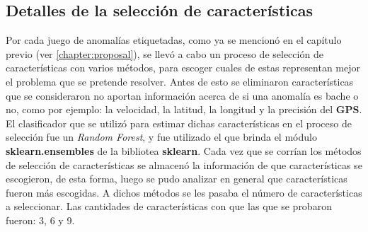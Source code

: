 	\subsection{Detalles de la selección de características}
		Por cada juego de anomalías etiquetadas, como ya se mencionó en el capítulo previo (ver \ref{chapter:proposal}), se llevó a cabo un proceso
		de selección de características con varios métodos, para escoger cuales de estas representan mejor el problema que se pretende resolver.
		Antes de esto se eliminaron características que se consideraron no aportan información acerca de si una anomalía es bache o no, como por ejemplo:
		la velocidad, la latitud, la longitud y la precisión del \textbf{GPS}.\\
		\indent El clasificador que se utilizó para estimar dichas características en el proceso de selección fue un \emph{Random Forest}, y fue
		utilizado el que brinda el módulo \textbf{sklearn.ensembles} de la bibliotea \textbf{sklearn}. Cada vez que se corrían los métodos de selección
		de características se almacenó la información de que características se escogieron, de esta forma, luego se pudo analizar en general que
		características fueron más escogidas. A dichos métodos se les pasaba el número de características a seleccionar. Las cantidades de características
		con que las que se probaron fueron: 3, 6 y 9.\\

